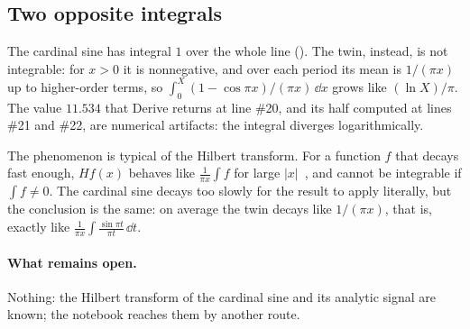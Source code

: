 \subsection{Two opposite integrals}

The cardinal sine has integral $1$ over the whole line
(). The twin, instead, is not integrable: for $x>0$ it
is nonnegative, and over each period its mean is $1/(\pi x)$ up to
higher-order terms, so $\int_0^X(1-\cos\pi x)/(\pi x)\,\dd x$ grows like
$(\ln X)/\pi$. The value $11.534$ that Derive returns at line \#20, and its
half computed at lines \#21 and \#22, are numerical artifacts: the integral
diverges logarithmically.

The phenomenon is typical of the Hilbert transform. For a function $f$ that
decays fast enough, $Hf(x)$ behaves like $\frac{1}{\pi x}\int f$ for large
$|x|$~\cite{king2009}, and cannot be integrable if $\int f\neq0$. The
cardinal sine decays too slowly for the result to apply literally, but the
conclusion is the same: on average the twin decays like $1/(\pi x)$, that is,
exactly like $\frac{1}{\pi x}\int\frac{\sin\pi t}{\pi t}\,\dd t$.

\paragraph{What remains open.}
Nothing: the Hilbert transform of the cardinal sine and its analytic signal are
known; the notebook reaches them by another route.
